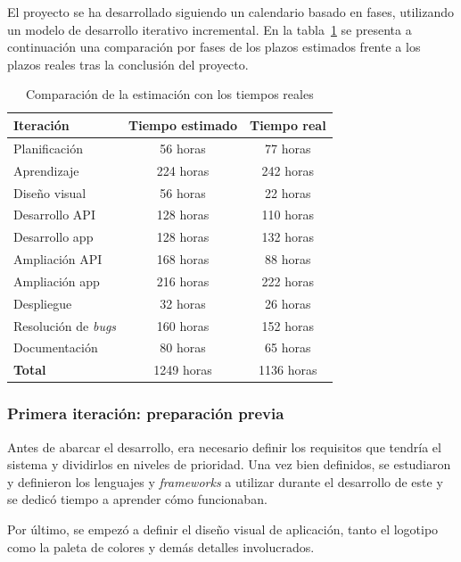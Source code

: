 \documentclass[a4paper,12pt]{article}
\begin{document}
El proyecto se ha desarrollado siguiendo un calendario basado en fases,
utilizando un modelo de desarrollo iterativo incremental. En la
tabla~\ref{tab:estimacion_tiempo} se presenta a continuación una comparación por
fases de los plazos estimados frente a los plazos reales tras la conclusión del
proyecto.

\begin{table}[hbtp]
  \centering
  \begin{tabular}{|l|c|c|}
    \hline
    \textbf{Iteración} & \textbf{Tiempo estimado} & \textbf{Tiempo real} \\
    \hline
    Planificación & 56 horas & 77 horas \\
    \hline
    Aprendizaje & 224 horas & 242 horas \\
    \hline
    Diseño visual & 56 horas & 22 horas \\
    \hline
    Desarrollo API & 128 horas & 110 horas \\
    \hline
    Desarrollo app & 128 horas & 132 horas \\
    \hline
    Ampliación API & 168 horas & 88 horas \\
    \hline
    Ampliación app & 216 horas & 222 horas \\
    \hline
    Despliegue & 32 horas & 26 horas \\
    \hline
    Resolución de \textit{bugs} & 160 horas & 152 horas \\
    \hline
    Documentación & 80 horas & 65 horas \\
    \hline
    \textbf{Total} & 1249 horas & 1136 horas \\
    \hline
  \end{tabular}
  \caption{Comparación de la estimación con los tiempos reales}
  \label{tab:estimacion_tiempo}
\end{table}


\subsubsection{Primera iteración: preparación previa}
\label{sec:primera_iteracion}

Antes de abarcar el desarrollo, era necesario definir los requisitos que tendría
el sistema y dividirlos en niveles de prioridad. Una vez bien definidos, se
estudiaron y definieron los lenguajes y \textit{frameworks} a utilizar durante
el desarrollo de este y se dedicó tiempo a aprender cómo funcionaban.

Por último, se empezó a definir el diseño visual de aplicación, tanto el
logotipo como la paleta de colores y demás detalles involucrados.
\end{document}
